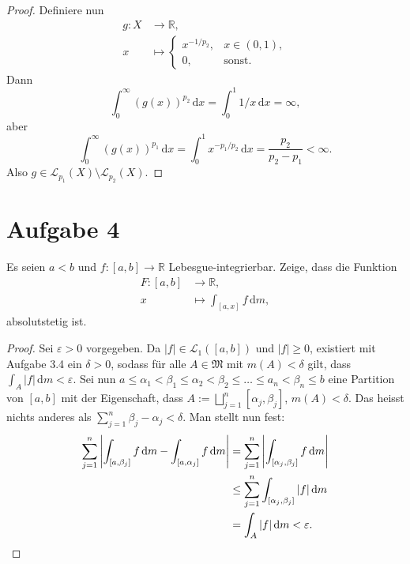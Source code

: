 \documentclass[10pt]{article}\usepackage[]{graphicx}\usepackage[]{color}
\newcommand{\R}{\mathbb{R}}
\newcommand{\df}{\,\textrm{d}}
\begin{document}
\begin{enumerate}[(a)]
\begin{proof}
          Definiere nun 
          \begin{align*}
            g: X  &\to      \R,\\
               x  &\mapsto  
                  \begin{cases}
                    x^{-1/p_2},    & x \in (0, 1),\\
                    0,            & \textrm{sonst}.
                  \end{cases}
          \end{align*}
          Dann 
          \[
            \int_0^{\infty} (g(x))^{p_2} \df x = \int_0^{1} 1/x \df x = \infty,
          \]
          aber
          \[
            \int_0^{\infty} (g(x))^{p_1} \df x = \int_0^{1} x^{-p_1/p_2} \df x = \frac{p_2}{p_2-p_1} < \infty.
          \]
           Also $g \in \mathscr{L}_{p_1}(X) \setminus \mathscr{L}_{p_2}(X)$.
        \end{proof}
\end{enumerate}

\section*{Aufgabe 4}
Es seien $a < b$ und $f: [a,b] \to \R$ Lebesgue-integrierbar.
Zeige, dass die Funktion
\begin{align*}
  F: [a,b] &\to \R, \\
  x &\mapsto \int_{[a,x]} f \df m,
\end{align*}
absolutstetig ist.

\begin{proof}
Sei $\varepsilon > 0$ vorgegeben.
Da $|f| \in \mathscr{L}_1([a,b])$ und $|f| \geq 0$,
existiert mit Aufgabe 3.4 ein $\delta > 0$, sodass für alle $A \in \mathfrak{M}$
mit $m(A) < \delta$ gilt, dass $\int_A |f| \df m < \varepsilon$.
Sei nun 
$a \leq \alpha_1 < \beta_1 \leq \alpha_2 < \beta_2 \leq \dots \leq a_n < \beta_n \leq b$
eine Partition von $[a,b]$ mit der Eigenschaft, dass
$A := \bigsqcup_{j = 1}^n [\alpha_j, \beta_j]$, $m(A) < \delta$.
Das heisst nichts anderes als $\sum_{j = 1}^{n} \beta_j - \alpha_j < \delta$.
Man stellt nun fest:
\begin{align*}
  \sum_{j = 1}^n \left|\int_{[a, \beta_j]}f \df m - \int_{[a, \alpha_j]} f \df m\right|
  &= \sum_{j = 1}^n \left|\int_{[\alpha_j, \beta_j]}f \df m\right| \\
  &\leq \sum_{j = 1}^n \int_{[\alpha_j, \beta_j]}|f| \df m\\
  &= \int_A |f| \df m < \varepsilon.\qedhere
\end{align*}
\end{proof}
\end{document}
